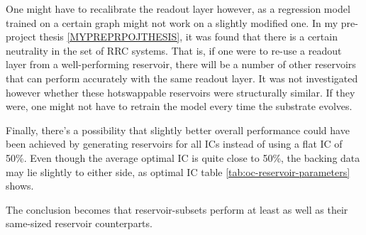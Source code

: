 One might have to recalibrate the readout layer however,
as a regression model trained on a certain graph might not work on a slightly modified one.
In my pre-project thesis \ref{MYPREPRPOJTHESIS},
it was found that there is a certain neutrality in the set of RRC systems.
That is, if one were to re-use a readout layer from a well-performing reservoir,
there will be a number of other reservoirs that can perform accurately with the same readout layer.
It was not investigated however whether these hotswappable reservoirs were structurally similar.
If they were, one might not have to retrain the model every time the substrate evolves.

Finally, there's a possibility that slightly better overall performance could have been achieved by generating reservoirs for all ICs instead of using a flat IC of 50\%.
Even though the average optimal IC is quite close to 50\%,
the backing data may lie slightly to either side,
as optimal IC table \ref{tab:oc-reservoir-parameters} shows.

The conclusion becomes that reservoir-subsets perform at least as well as their same-sized reservoir counterparts.
